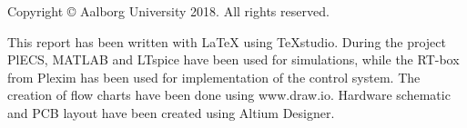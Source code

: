 \thispagestyle{empty}
{\small
\strut\vfill %
\noindent Copyright \copyright{} Aalborg University 2018. All rights reserved.\par
\vspace{0.2cm}
\noindent This report has been written with \LaTeX{} using TeXstudio. During the project PlECS, MATLAB and LTspice have been used for simulations, while the RT-box from Plexim has been used for implementation of the control system. The creation of flow charts have been done using www.draw.io. Hardware schematic and PCB layout have been created using Altium Designer.

}
\clearpage

